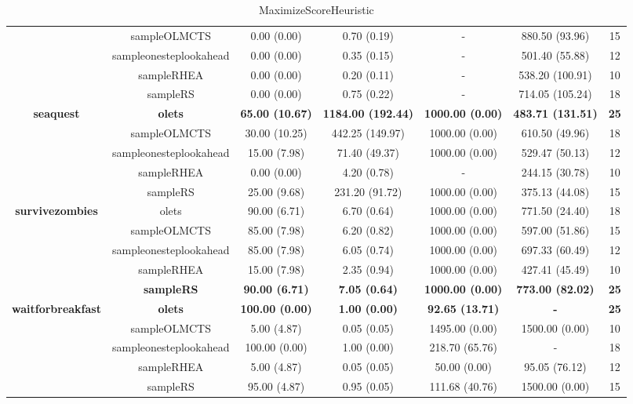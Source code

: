 \begin{table*}[!t]
\begin{center}
\begin{adjustbox}{width=1\textwidth}
\begin{tabular}{|c|c|c|c|c|c|c|}
 \\
\cline{2-7}
 & sampleOLMCTS & 0.00 (0.00) & 0.70 (0.19) &  -  & 880.50 (93.96) & 15
 \\
\cline{2-7}
 & sampleonesteplookahead & 0.00 (0.00) & 0.35 (0.15) &  -  & 501.40 (55.88) & 12
 \\
\cline{2-7}
 & sampleRHEA & 0.00 (0.00) & 0.20 (0.11) &  -  & 538.20 (100.91) & 10
 \\
\cline{2-7}
 & sampleRS & 0.00 (0.00) & 0.75 (0.22) &  -  & 714.05 (105.24) & 18
 \\
\hline
\hline
\cline{2-7}
\multirow{5}{*}{\textbf{seaquest}} & \textbf{olets} & \textbf{65.00 (10.67)} & \textbf{1184.00 (192.44)} & \textbf{1000.00 (0.00)} & \textbf{483.71 (131.51)} & \textbf{25}
 \\
\cline{2-7}
 & sampleOLMCTS & 30.00 (10.25) & 442.25 (149.97) & 1000.00 (0.00) & 610.50 (49.96) & 18
 \\
\cline{2-7}
 & sampleonesteplookahead & 15.00 (7.98) & 71.40 (49.37) & 1000.00 (0.00) & 529.47 (50.13) & 12
 \\
\cline{2-7}
 & sampleRHEA & 0.00 (0.00) & 4.20 (0.78) &  -  & 244.15 (30.78) & 10
 \\
\cline{2-7}
 & sampleRS & 25.00 (9.68) & 231.20 (91.72) & 1000.00 (0.00) & 375.13 (44.08) & 15
 \\
\hline
\hline
\cline{2-7}
\multirow{5}{*}{\textbf{survivezombies}} & olets & 90.00 (6.71) & 6.70 (0.64) & 1000.00 (0.00) & 771.50 (24.40) & 18
 \\
\cline{2-7}
 & sampleOLMCTS & 85.00 (7.98) & 6.20 (0.82) & 1000.00 (0.00) & 597.00 (51.86) & 15
 \\
\cline{2-7}
 & sampleonesteplookahead & 85.00 (7.98) & 6.05 (0.74) & 1000.00 (0.00) & 697.33 (60.49) & 12
 \\
\cline{2-7}
 & sampleRHEA & 15.00 (7.98) & 2.35 (0.94) & 1000.00 (0.00) & 427.41 (45.49) & 10
 \\
\cline{2-7}
 & \textbf{sampleRS} & \textbf{90.00 (6.71)} & \textbf{7.05 (0.64)} & \textbf{1000.00 (0.00)} & \textbf{773.00 (82.02)} & \textbf{25}
 \\
\hline
\hline
\cline{2-7}
\multirow{5}{*}{\textbf{waitforbreakfast}} & \textbf{olets} & \textbf{100.00 (0.00)} & \textbf{1.00 (0.00)} & \textbf{92.65 (13.71)} & \textbf{ - } & \textbf{25}
 \\
\cline{2-7}
 & sampleOLMCTS & 5.00 (4.87) & 0.05 (0.05) & 1495.00 (0.00) & 1500.00 (0.00) & 10
 \\
\cline{2-7}
 & sampleonesteplookahead & 100.00 (0.00) & 1.00 (0.00) & 218.70 (65.76) &  -  & 18
 \\
\cline{2-7}
 & sampleRHEA & 5.00 (4.87) & 0.05 (0.05) & 50.00 (0.00) & 95.05 (76.12) & 12
 \\
\cline{2-7}
 & sampleRS & 95.00 (4.87) & 0.95 (0.05) & 111.68 (40.76) & 1500.00 (0.00) & 15
 \\
\hline
\hline
\hline
\end{tabular}
\end{adjustbox}
\caption{MaximizeScoreHeuristic}
\label{tab:weights}
\end{center}
\end{table*}
